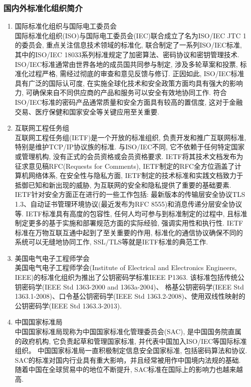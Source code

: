 \subsubsection{国内外标准化组织简介}
\begin{enumerate}
\item 国际标准化组织与国际电工委员会\\
    国际标准化组织(ISO)与国际电工委员会(IEC)联合成立了名为ISO/IEC JTC 1的委员会, 重点关注信息技术领域的标准化, 联合制定了一系列ISO/IEC标准, 
    其中的ISO/IEC 18033系列标准规定了加密算法、密码协议和密钥管理技术. 
    ISO/IEC标准通常由世界各地的成员国共同参与制定, 涉及多轮草案和投票, 标准化过程严格, 需经过彻底的审查和意见反馈与修订. 
    正因如此, ISO/IEC标准具有广泛的国际认可度, 在实施全球化技术和安全政策方面均具有强大的影响力, 可确保来自不同供应商的产品和服务可以安全有效地协同工作. 
    符合ISO/IEC标准的密码产品通常质量和安全方面具有较高的置信度, 这对于金融交易、医疗保健和国家安全等关键应用至关重要. 
         

\item 互联网工程任务组\\
    互联网工程任务组(IETF)是一个开放的标准组织, 负责开发和推广互联网标准, 特别是维护TCP/IP协议族的标准. 
    与ISO/IEC不同, 它不依赖于任何特定国家或管理机构, 没有正式的会员资格或会员资格要求. 
    IETF将其技术文档发布为征求意见稿RFC(Requests for Comments), IETF制定的RFC全方位涵盖了计算机网络体系, 
    在安全性与隐私方面, IETF制定的技术标准和实践文档致力于抵御已知和新出现的威胁, 为互联网的安全和隐私提供了重要的基础要素. 
    IETF针对安全方面正在进行的一些工作包括: 最新版本的传输层安全协议TLS 1.3、自动证书管理环境协议(最近发布为RFC 8555)和消息传递分层安全协议等. 
    IETF标准具有高度的包容性, 任何人均可参与到标准制定的过程中, 且标准制定更多的基于实施和部署规范方面的实际经验, 强调实用性和执行性. 
    IETF标准在万物互联互通中起到了至关重要的作用, 标准化的通信协议确保不同的系统可以无缝地协同工作, SSL/TLS等就是IETF标准的典范工作. 

\item 美国电气电子工程师学会\\
    美国电气电子工程师学会(Institute of Electrical and Electronics Engineers, IEEE)的标准化组织为推出了公钥密码学标准IEEE P1363. 
    该标准包括传统公钥密码学(IEEE Std 1363-2000 and 1363a-2004)、
    格基公钥密码学(IEEE Std 1363.1-2008)、口令基公钥密码学(IEEE Std 1363.2-2008)、使用双线性映射的公钥密码学(IEEE Std 1363.3-2013). 
         
\item 中国国家标准局\\
    中国国家标准局现称为中国国家标准化管理委员会(SAC), 是中国国务院直属的政府机构, 它负责起草和管理国家标准, 并代表中国加入ISO/IEC等国际标准组织。
    中国国家标准局一直积极制定信息安全国家标准, 包括密码算法和协议. SAC的标准对国内行业具有重大影响，并且经常被用作中国境内法规的基础. 
    随着中国在全球贸易中的地位不断提升, SAC标准在国际上的影响力也越来越高. 



\end{enumerate}
